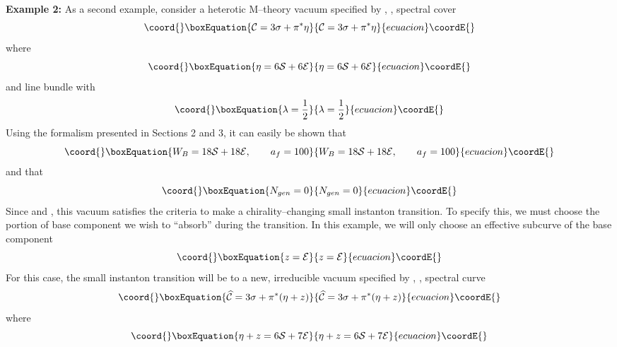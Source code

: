 \documentclass[a4paper,12pt]{article}
\numberwithin{equation}{section}
\def\cC{{\mathcal C}}
\def\cE{{\mathcal E}}
\def\cN{{\mathcal N}}
\def\cS{{\mathcal S}}
\theoremstyle{plain}
\begin{document}
\noindent
{\bf Example 2:} \quad
As a second example, consider a heterotic M--theory vacuum specified by
\coordHE{}, \coordHE{}, spectral cover
\begin{equation}\coord{}\boxEquation{
{\cal{C}}=3\sigma+\pi^{*}\eta
\label{eq:115}
}{
{\cal{C}}=3\sigma+\pi^{*}\eta
}{ecuacion}\coordE{}\end{equation}
where
\begin{equation}\coord{}\boxEquation{
\eta=6\cS+6\cE
\label{eq:116}
}{
\eta=6\cS+6\cE
}{ecuacion}\coordE{}\end{equation}
and line bundle \myHighlight{$\cN$}\coordHE{} with
\begin{equation}\coord{}\boxEquation{
\lambda=\frac{1}{2}
\label{eq:117}
}{
\lambda=\frac{1}{2}
}{ecuacion}\coordE{}\end{equation}
Using the formalism presented in Sections 2 and 3, it can easily be shown that
\begin{equation}\coord{}\boxEquation{
W_{B}=18\cS+18\cE, \qquad a_{f}=100
\label{eq:118}
}{
W_{B}=18\cS+18\cE, \qquad a_{f}=100
}{ecuacion}\coordE{}\end{equation}
and that 
\begin{equation}\coord{}\boxEquation{
N_{gen}=0
\label{eq:119}
}{
N_{gen}=0
}{ecuacion}\coordE{}\end{equation}
Since \coordHE{} and \coordHE{}, this vacuum satisfies the
criteria to make a chirality--changing small instanton transition. To specify
this, we must choose the portion of base component \coordHE{} we wish to
``absorb'' during the transition. In this example, we will only choose an
effective subcurve of the base component
\begin{equation}\coord{}\boxEquation{
z=\cE
\label{eq:120}
}{
z=\cE
}{ecuacion}\coordE{}\end{equation}
For this case, the small instanton transition will be to a new, irreducible
vacuum specified by \coordHE{}, \coordHE{}, spectral curve
\begin{equation}\coord{}\boxEquation{
\widehat{\cC}=3\sigma+\pi^{*}(\eta+ z)
\label{eq:121}
}{
\widehat{\cC}=3\sigma+\pi^{*}(\eta+ z)
}{ecuacion}\coordE{}\end{equation}
where
\begin{equation}\coord{}\boxEquation{
\eta+ z=6\cS+7\cE
\label{eq:122}
}{
\eta+ z=6\cS+7\cE
}{ecuacion}\coordE{}\end{equation}
\end{document}
